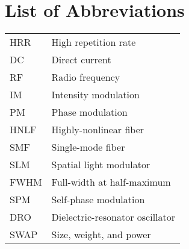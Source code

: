  \chapter*{List of Abbreviations}
 \label{ch:abbreviations}
 



\begin{longtable}{l l}
	HRR & High repetition rate \\
	DC & Direct current \\
	RF & Radio frequency \\
	IM & Intensity modulation \\
	PM & Phase modulation \\
	HNLF & Highly-nonlinear fiber \\
	SMF & Single-mode fiber \\
	SLM & Spatial light modulator \\
	FWHM & Full-width at half-maximum \\
	SPM & Self-phase modulation \\
	DRO & Dielectric-resonator oscillator \\
	SWAP & Size, weight, and power \\

\end{longtable}
